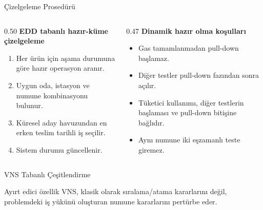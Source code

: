 \documentclass[aspectratio=169,11pt]{beamer}
\begin{document}
\begin{frame}{Çizelgeleme Prosedürü}
  \begin{columns}[T,totalwidth=\textwidth]
    \begin{column}{0.50\textwidth}
      \textbf{EDD tabanlı hazır-küme çizelgeleme}
      \begin{enumerate}
        \item Her ürün için aşama durumuna göre hazır operasyon aranır.
        \item Uygun oda, istasyon ve numune kombinasyonu bulunur.
        \item Küresel aday havuzundan en erken teslim tarihli iş seçilir.
        \item Sistem durumu güncellenir.
      \end{enumerate}
    \end{column}
    \begin{column}{0.47\textwidth}
      \textbf{Dinamik hazır olma koşulları}
      \begin{itemize}
        \item Gas tamamlanmadan pull-down başlamaz.
        \item Diğer testler pull-down fazından sonra açılır.
        \item Tüketici kullanımı, diğer testlerin başlaması ve pull-down bitişine bağlıdır.
        \item Aynı numune iki eşzamanlı teste giremez.
      \end{itemize}
    \end{column}
  \end{columns}
\end{frame}

\begin{frame}{VNS Tabanlı Çeşitlendirme}
  \begin{center}
  \end{center}

  \begin{block}{Ayırt edici özellik}
    VNS, klasik olarak sıralama/atama kararlarını değil, problemdeki iş yükünü oluşturan numune kararlarını pertürbe eder.
  \end{block}
\end{frame}
\end{document}
